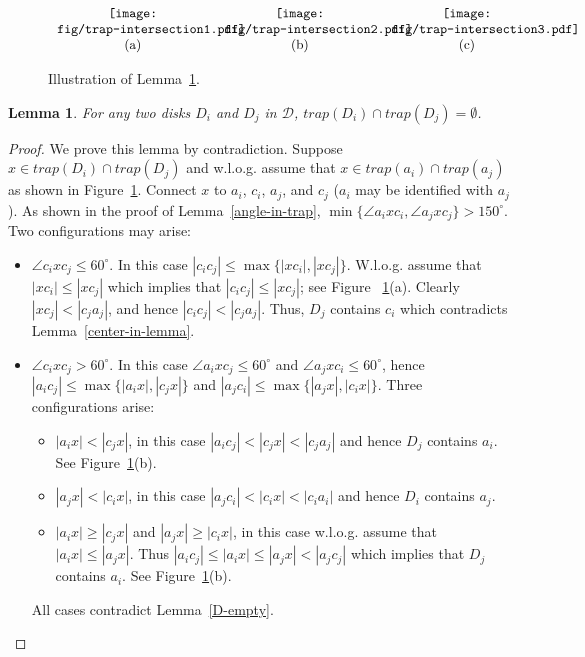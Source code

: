 \documentclass[11pt,a4paper]{article}
\newtheorem{lemma}{Lemma}
\begin{document}
\begin{figure}[htb]
  \centering
\setlength{\tabcolsep}{0in}
  $\begin{tabular}{ccc}
 \multicolumn{1}{m{.33\columnwidth}}{\centering\texttt{[image: fig/trap-intersection1.pdf]}}
&\multicolumn{1}{m{.33\columnwidth}}{\centering\texttt{[image: fig/trap-intersection2.pdf]}}
&\multicolumn{1}{m{.33\columnwidth}}{\centering\texttt{[image: fig/trap-intersection3.pdf]}}\\
(a) & (b)& (c)
\end{tabular}$
  \caption{Illustration of Lemma~\ref{intersecting-trap}.}
\label{trap-intersection-fig}
\end{figure}


\begin{lemma}
\label{intersecting-trap}
For any two disks $D_i$ and $D_j$ in $\mathcal{D}$, $trap(D_i)\cap trap(D_j)=\emptyset$.
\end{lemma}
\begin{proof}
 We prove this lemma by contradiction. Suppose $x\in trap(D_i)\cap trap(D_j)$ and w.l.o.g. assume that $x\in trap(a_i)\cap trap(a_j)$ as shown in Figure~\ref{trap-intersection-fig}. Connect $x$ to $a_i$, $c_i$, $a_j$, and $c_j$ ($a_i$ may be identified with $a_j$). As shown in the proof of Lemma~\ref{angle-in-trap}, $\min\{\angle a_ixc_i, \angle a_jxc_j\} > 150^\circ$. Two configurations may arise: 
\begin{itemize}
 \item $\angle c_ixc_j \le 60^{\circ}$. In this case $|c_ic_j|\le \max\{|xc_i|,|xc_j|\}$. W.l.o.g. assume that $|xc_i|\le|xc_j|$ which implies that $|c_ic_j|\le |xc_j|$; see Figure ~\ref{trap-intersection-fig}(a). Clearly $|xc_j|<|c_ja_j|$, and hence $|c_ic_j|<|c_ja_j|$. Thus, $D_j$ contains $c_i$ which contradicts Lemma~\ref{center-in-lemma}.
  \item $\angle c_ixc_j > 60^{\circ}$. In this case $\angle a_ixc_j \le 60^\circ$ and $\angle a_jxc_i \le 60^\circ$, hence $|a_ic_j|\le \max\{|a_ix|,|c_jx|\}$ and $|a_jc_i|\le \max\{|a_jx|,|c_ix|\}$. Three configurations arise:

\begin{itemize}
 \item $|a_ix|<|c_jx|$, in this case $|a_ic_j|< |c_jx|<|c_ja_j|$ and hence $D_j$ contains $a_i$. See Figure~\ref{trap-intersection-fig}(b).
  \item $|a_jx|<|c_ix|$, in this case $|a_jc_i|< |c_ix|< |c_ia_i|$ and hence $D_i$ contains $a_j$. 
  \item $|a_ix|\ge|c_jx|$ and $|a_jx|\ge|c_ix|$, in this case w.l.o.g. assume that $|a_ix|\le|a_jx|$. Thus $|a_ic_j|\le |a_ix|\le |a_jx|<|a_jc_j|$ which implies that $D_j$ contains $a_i$. See Figure~\ref{trap-intersection-fig}(b).
\end{itemize}
All cases contradict Lemma~\ref{D-empty}. 
\end{itemize}
\end{proof}
\end{document}
